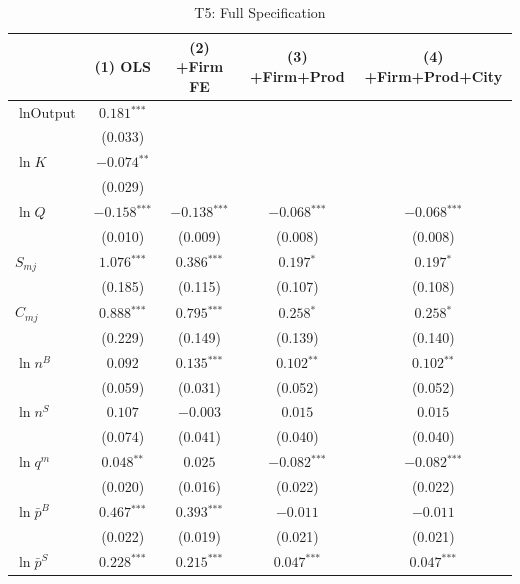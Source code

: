 \documentclass[12pt]{article}
\newcommand{\sym}[1]{\ensuremath{^{\text{#1}}}}
\newcommand{\se}[1]{{\small(#1)}}
\newcommand{\abs}{\textemdash}
\begin{document}
\begin{table}[H]
  \centering
  \caption{T5: Full Specification}
  \label{tab:t5}
  \begin{threeparttable}
    \begin{tabular}{lcccc}
      \toprule
      & (1) OLS & (2) +Firm FE & (3) +Firm+Prod & (4) +Firm+Prod+City \\
      \midrule
      \(\ln \text{Output}\) & \(0.181\sym{***}\) & \abs & \abs & \abs \\
                             & \se{0.033} & & & \\[4pt]
      \(\ln K\) & \(-0.074\sym{**}\) & \abs & \abs & \abs \\
                & \se{0.029} & & & \\[4pt]
      \(\ln Q\) & \(-0.158\sym{***}\) & \(-0.138\sym{***}\) & \(-0.068\sym{***}\) & \(-0.068\sym{***}\) \\
                & \se{0.010} & \se{0.009} & \se{0.008} & \se{0.008} \\[4pt]
      \(S_{mj}\) & \(1.076\sym{***}\) & \(0.386\sym{***}\) & \(0.197\sym{*}\) & \(0.197\sym{*}\) \\
                 & \se{0.185} & \se{0.115} & \se{0.107} & \se{0.108} \\[4pt]
      \(C_{mj}\) & \(0.888\sym{***}\) & \(0.795\sym{***}\) & \(0.258\sym{*}\) & \(0.258\sym{*}\) \\
                 & \se{0.229} & \se{0.149} & \se{0.139} & \se{0.140} \\[4pt]
      \(\ln n^{B}\) & \(0.092\) & \(0.135\sym{***}\) & \(0.102\sym{**}\) & \(0.102\sym{**}\) \\
                    & \se{0.059} & \se{0.031} & \se{0.052} & \se{0.052} \\[4pt]
      \(\ln n^{S}\) & \(0.107\) & \(-0.003\) & \(0.015\) & \(0.015\) \\
                    & \se{0.074} & \se{0.041} & \se{0.040} & \se{0.040} \\[4pt]
      \(\ln q^{m}\) & \(0.048\sym{**}\) & \(0.025\) & \(-0.082\sym{***}\) & \(-0.082\sym{***}\) \\
                    & \se{0.020} & \se{0.016} & \se{0.022} & \se{0.022} \\[4pt]
      \(\ln \bar{p}^{B}\) & \(0.467\sym{***}\) & \(0.393\sym{***}\) & \(-0.011\) & \(-0.011\) \\
                          & \se{0.022} & \se{0.019} & \se{0.021} & \se{0.021} \\[4pt]
      \(\ln \bar{p}^{S}\) & \(0.228\sym{***}\) & \(0.215\sym{***}\) & \(0.047\sym{***}\) & \(0.047\sym{***}\) \\

\end{tabular}
\end{threeparttable}
\end{table}
\end{document}
